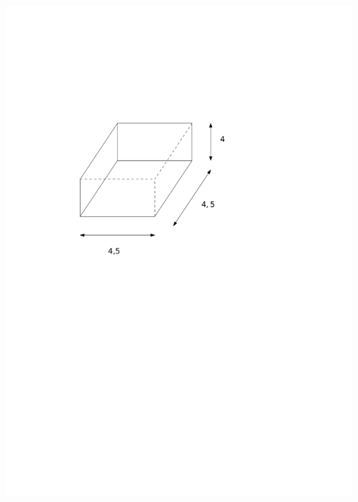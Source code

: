 \documentclass[a4paper,11pt]{report}
\begin{document}
\begin{exo}
{\begin{tasks}
    \task ~\\ \includegraphics[scale=0.5]{media/gm-02/pave2.pdf}

\end{tasks}}
\end{exo}
\end{document}
